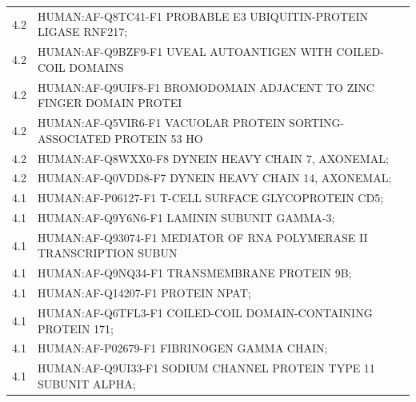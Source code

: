 \begin{table}[]
{\begin{tabular}{cl}
\rowcolor[HTML]{FCE4D6} 
4.2                                                 & HUMAN:AF-Q8TC41-F1 PROBABLE E3 UBIQUITIN-PROTEIN LIGASE RNF217;          \\
\rowcolor[HTML]{F8CBAD} 
4.2                                                 & HUMAN:AF-Q9BZF9-F1 UVEAL AUTOANTIGEN WITH COILED-COIL DOMAINS            \\
\rowcolor[HTML]{FCE4D6} 
4.2                                                 & HUMAN:AF-Q9UIF8-F1 BROMODOMAIN ADJACENT TO ZINC FINGER DOMAIN PROTEI     \\
\rowcolor[HTML]{F8CBAD} 
4.2                                                 & HUMAN:AF-Q5VIR6-F1 VACUOLAR PROTEIN SORTING-ASSOCIATED PROTEIN 53 HO     \\
\rowcolor[HTML]{FCE4D6} 
4.2                                                 & HUMAN:AF-Q8WXX0-F8 DYNEIN HEAVY CHAIN 7, AXONEMAL;                       \\
\rowcolor[HTML]{F8CBAD} 
4.2                                                 & HUMAN:AF-Q0VDD8-F7 DYNEIN HEAVY CHAIN 14, AXONEMAL;                      \\
\rowcolor[HTML]{FCE4D6} 
4.1                                                 & HUMAN:AF-P06127-F1 T-CELL SURFACE GLYCOPROTEIN CD5;                      \\
\rowcolor[HTML]{F8CBAD} 
4.1                                                 & HUMAN:AF-Q9Y6N6-F1 LAMININ SUBUNIT GAMMA-3;                              \\
\rowcolor[HTML]{FCE4D6} 
4.1                                                 & HUMAN:AF-Q93074-F1 MEDIATOR OF RNA POLYMERASE II TRANSCRIPTION SUBUN     \\
\rowcolor[HTML]{F8CBAD} 
4.1                                                 & HUMAN:AF-Q9NQ34-F1 TRANSMEMBRANE PROTEIN 9B;                             \\
\rowcolor[HTML]{FCE4D6} 
4.1                                                 & HUMAN:AF-Q14207-F1 PROTEIN NPAT;                                         \\
\rowcolor[HTML]{F8CBAD} 
4.1                                                 & HUMAN:AF-Q6TFL3-F1 COILED-COIL DOMAIN-CONTAINING PROTEIN 171;            \\
\rowcolor[HTML]{FCE4D6} 
4.1                                                 & HUMAN:AF-P02679-F1 FIBRINOGEN GAMMA CHAIN;                               \\
\rowcolor[HTML]{F8CBAD} 
4.1                                                 & HUMAN:AF-Q9UI33-F1 SODIUM CHANNEL PROTEIN TYPE 11 SUBUNIT ALPHA;        
\end{tabular}
}
\label{Table:dali_atg9_rent}
\end{table}


